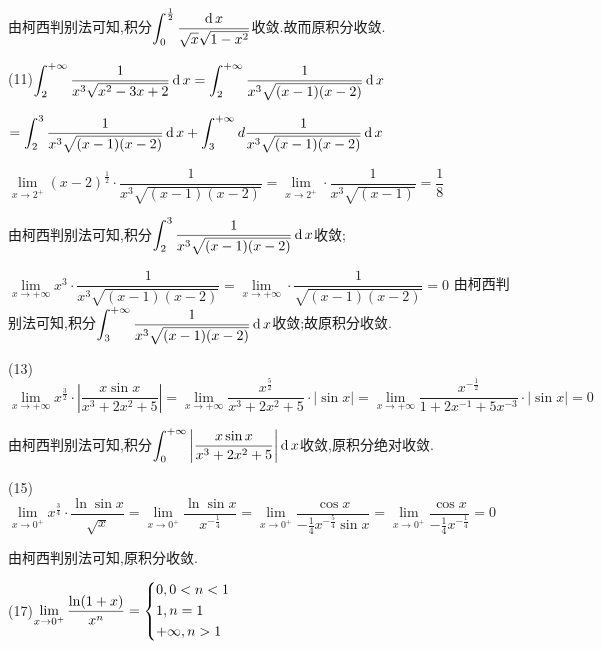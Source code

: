 由柯西判别法可知,积分$\displaystyle\int_0^{\frac{1}{2}} {\dfrac{{\operatorname{\mathop{}\!\mathrm{d}} x}}{{\sqrt x \sqrt {1 - {x^2}} }}} $收敛.故而原积分收敛.

(11)$\displaystyle\int_2^{ + \infty } {\dfrac{1}{{{x^3}\sqrt {{x^2} - 3x + 2} }}\operatorname{\mathop{}\!\mathrm{d}} x}  = \displaystyle\int_2^{ + \infty } {\dfrac{1}{{{x^3}\sqrt {(x - 1)(x - 2)} }}\operatorname{\mathop{}\!\mathrm{d}} x} $

$= \displaystyle\int_2^3 {\dfrac{1}{{{x^3}\sqrt {(x - 1)(x - 2)} }}\operatorname{\mathop{}\!\mathrm{d}} x}  + \displaystyle\int_3^{ + \infty } {d\frac{1}{{{x^3}\sqrt {(x - 1)(x - 2)} }}\operatorname{\mathop{}\!\mathrm{d}} x} $

$\mathop {\lim }\limits_{x \to {2^ + }} {(x - 2)^{\frac{1}{2}}} \cdot \dfrac{1}{{{x^3}\sqrt {(x - 1)(x - 2)} }} = \mathop {\lim }\limits_{x \to {2^ + }}  \cdot \dfrac{1}{{{x^3}\sqrt {(x - 1)} }} = \dfrac{1}{8}$

由柯西判别法可知,积分$\displaystyle\int_2^3 {\dfrac{1}{{{x^3}\sqrt {(x - 1)(x - 2)} }}\operatorname{\mathop{}\!\mathrm{d}} x} $收敛;

$\lim\limits_{x \to +\infty} {x^3} \cdot \dfrac{1}{{{x^3}\sqrt {(x - 1)(x - 2)} }} = \lim\limits_{x \to +\infty}  \cdot \dfrac{1}{{\sqrt {(x - 1)(x - 2)} }} = 0$
由柯西判别法可知,积分$\displaystyle\int_3^{ + \infty } {\dfrac{1}{{{x^3}\sqrt {(x - 1)(x - 2)} }}\operatorname{\mathop{}\!\mathrm{d}} x} $收敛;故原积分收敛.

(13)$\lim\limits_{x \to +\infty} {x^{\frac{3}{2}}} \cdot \left| {\dfrac{{x\sin x}}{{{x^3} + 2{x^2} + 5}}} \right| = \lim\limits_{x \to +\infty} \dfrac{{{x^{\frac{5}{2}}}}}{{{x^3} + 2{x^2} + 5}} \cdot \left| {\sin x} \right| = \lim\limits_{x \to +\infty} \dfrac{{{x^{ - \frac{1}{2}}}}}{{1 + 2{x^{ - 1}} + 5{x^{ - 3}}}} \cdot \left| {\sin x} \right| = 0$

由柯西判别法可知,积分$\displaystyle\int_0^{ + \infty } {\left| {\dfrac{{x\sin x}}{{{x^3} + 2{x^2} + 5}}} \right|\operatorname{\mathop{}\!\mathrm{d}} x} $收敛,原积分绝对收敛.

(15)$\lim\limits_{x \to 0^+} {x^{\frac{3}{4}}} \cdot \dfrac{{\ln \sin x}}{{\sqrt x }} = \lim\limits_{x \to 0^+} \dfrac{{\ln \sin x}}{{{x^{ - \frac{1}{4}}}}} = \lim\limits_{x \to 0^+} \dfrac{{\cos x}}{{ - \frac{1}{4}{x^{ - \frac{5}{4}}}\sin x}} = \lim\limits_{x \to 0^+} \dfrac{{\cos x}}{{ - \frac{1}{4}{x^{ - \frac{1}{4}}}}} = 0$

由柯西判别法可知,原积分收敛.

(17)$\mathop {\lim }\limits_{x \to {0^ +} } \dfrac{{\ln (1 + x)}}{{{x^n}}} = \left\{ \begin{gathered}
  0,0 < n < 1 \hfill \\
  1,n = 1 \hfill \\
   + \infty ,n > 1 \hfill \\
\end{gathered}  \right.$

